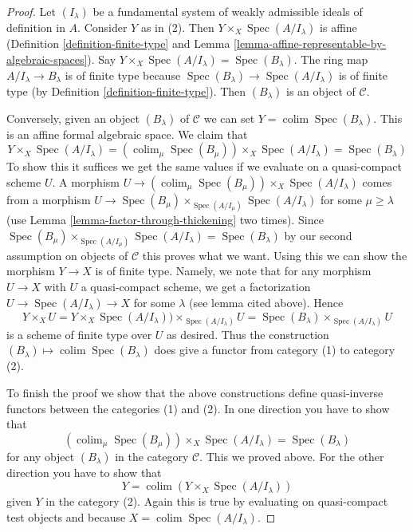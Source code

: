 \documentclass{stacks-project}
\theoremstyle{plain}
\theoremstyle{definition}
\theoremstyle{remark}
\numberwithin{equation}{subsection}
\def\colim{\mathop{\mathrm{colim}}\nolimits}
\def\Spec{\mathop{\mathrm{Spec}}}
\begin{document}
\begin{proof}
Let $(I_\lambda)$ be a fundamental system of weakly admissible ideals
of definition in $A$. Consider $Y$ as in (2). Then
$Y \times_X \Spec(A/I_\lambda)$ is affine
(Definition \ref{definition-finite-type}
and Lemma \ref{lemma-affine-representable-by-algebraic-spaces}).
Say $Y \times_X \Spec(A/I_\lambda) = \Spec(B_\lambda)$.
The ring map $A/I_\lambda \to B_\lambda$ is of finite type
because $\Spec(B_\lambda) \to \Spec(A/I_\lambda)$ is of
finite type
(by Definition \ref{definition-finite-type}).
Then $(B_\lambda)$ is an object of $\mathcal{C}$.

\medskip\noindent
Conversely, given an object $(B_\lambda)$ of $\mathcal{C}$ we can set
$Y = \colim \Spec(B_\lambda)$. This is an affine formal algebraic
space. We claim that
$$
Y \times_X \Spec(A/I_\lambda) =
\left(\colim_\mu \Spec(B_\mu)\right) \times_X \Spec(A/I_\lambda) =
\Spec(B_\lambda)
$$
To show this it suffices we get the same values if we evaluate
on a quasi-compact scheme $U$. A morphism
$U \to \left(\colim_\mu \Spec(B_\mu)\right) \times_X \Spec(A/I_\lambda)$
comes from a morphism
$U \to \Spec(B_\mu) \times_{\Spec(A/I_\mu)} \Spec(A/I_\lambda)$
for some $\mu \geq \lambda$ (use
Lemma \ref{lemma-factor-through-thickening} two times). Since
$\Spec(B_\mu) \times_{\Spec(A/I_\mu)} \Spec(A/I_\lambda) = \Spec(B_\lambda)$
by our second assumption on objects of $\mathcal{C}$
this proves what we want. Using this we can show the morphism
$Y \to X$ is of finite type. Namely, we note that
for any morphism $U \to X$ with $U$ a quasi-compact scheme, we get
a factorization $U \to \Spec(A/I_\lambda) \to X$ for some $\lambda$
(see lemma cited above). Hence
$$
Y \times_X U =
Y \times_X \Spec(A/I_\lambda)) \times_{\Spec(A/I_\lambda)} U =
\Spec(B_\lambda) \times_{\Spec(A/I_\lambda)} U
$$
is a scheme of finite type over $U$ as desired. Thus the construction
$(B_\lambda) \mapsto \colim \Spec(B_\lambda)$ does give a functor
from category (1) to category (2).

\medskip\noindent
To finish the proof we show that the above constructions
define quasi-inverse functors between the categories (1) and (2).
In one direction you have to show that
$$
\left(\colim_\mu \Spec(B_\mu)\right) \times_X \Spec(A/I_\lambda) =
\Spec(B_\lambda)
$$
for any object $(B_\lambda)$ in the category $\mathcal{C}$.
This we proved above. For
the other direction you have to show that
$$
Y = \colim (Y \times_X \Spec(A/I_\lambda))
$$
given $Y$ in the category (2). Again this is true by evaluating on
quasi-compact test objects and because $X = \colim \Spec(A/I_\lambda)$.
\end{proof}
\end{document}
